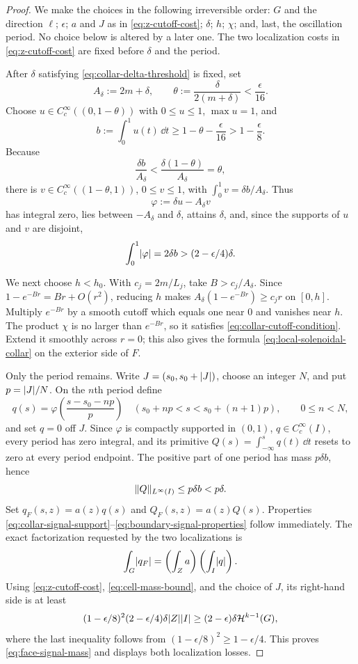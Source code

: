 \begin{proof}
We make the choices in the following irreversible order: $G$ and the
direction $\ell$; $\epsilon$; $a$ and $J$ as in
\eqref{eq:z-cutoff-cost}; $\delta$; $h$; $\chi$; and, last, the oscillation
period.  No choice below is altered by a later one.  The two localization
costs in \eqref{eq:z-cutoff-cost} are fixed before $\delta$ and the period.

After $\delta$ satisfying \eqref{eq:collar-delta-threshold} is fixed, set
\[
 A_\delta:=2m+\delta,
 \qquad
 \theta:=\frac{\delta}{2(m+\delta)}<\frac{\epsilon}{16}.
\]
Choose $u\in C_c^\infty((0,1-\theta))$ with $0\le u\le1$,
$\max u=1$, and
\[
 b:=\int_0^1u(t)\,\dd t
 \ge1-\theta-\frac{\epsilon}{16}>1-\frac{\epsilon}{8}.
\]
Because
\[
 \frac{\delta b}{A_\delta}
 <\frac{\delta(1-\theta)}{A_\delta}=\theta,
\]
there is $v\in C_c^\infty((1-\theta,1))$, $0\le v\le1$, with
$\int_0^1v=\delta b/A_\delta$.  Thus
\[
 \varphi:=\delta u-A_\delta v
\]
has integral zero, lies between $-A_\delta$ and $\delta$, attains $\delta$,
and, since the supports of $u$ and $v$ are disjoint,
\begin{equation}
\label{eq:cell-mass-bound}
 \int_0^1\lvert \varphi \rvert=2\delta b>(2-\epsilon/4)\delta.
\end{equation}

We next choose $h<h_0$.  With $c_j=2m/L_j$, take
$B>c_j/A_\delta$.  Since $1-e^{-Br}=Br+O(r^2)$, reducing $h$ makes
$A_\delta(1-e^{-Br})\ge c_jr$ on $[0,h]$.  Multiply $e^{-Br}$ by a smooth
cutoff which equals one near $0$ and vanishes near $h$.  The product $\chi$
is no larger than $e^{-Br}$, so it satisfies
\eqref{eq:collar-cutoff-condition}.  Extend it smoothly across $r=0$; this
also gives the formula \eqref{eq:local-solenoidal-collar} on the exterior side
of $F$.

Only the period remains.  Write $J=(s_0,s_0+\lvert J \rvert)$, choose an integer $N$,
and put $p=\lvert J \rvert/N$.  On the $n$th period define
\[
 q(s)=\varphi\left(\frac{s-s_0-np}{p}\right)
 \quad (s_0+np<s<s_0+(n+1)p),
 \qquad 0\le n<N,
\]
and set $q=0$ off $J$.  Since $\varphi$ is compactly supported in $(0,1)$,
$q\in C_c^\infty(I)$, every period has zero integral, and its primitive
$Q(s)=\int_{-\infty}^sq(t)\,\dd t$ resets to zero at every period endpoint.
The positive part of one period has mass $p\delta b$, hence
\begin{equation}
\label{eq:primitive-period-bound}
 \lVert Q \rVert_{L^\infty(I)}\le p\delta b<p\delta.
\end{equation}
Set $q_F(s,z)=a(z)q(s)$ and $Q_F(s,z)=a(z)Q(s)$.  Properties
\eqref{eq:collar-signal-support}--\eqref{eq:boundary-signal-properties}
follow immediately.  The exact factorization requested by the two
localizations is
\[
 \int_G\lvert q_F \rvert
 =\left(\int_Za\right)\left(\int_I\lvert q \rvert\right).
\]
Using \eqref{eq:z-cutoff-cost}, \eqref{eq:cell-mass-bound}, and the choice of
$J$, its right-hand side is at least
\[
 (1-\epsilon/8)^2(2-\epsilon/4)\delta\lvert Z \rvert\lvert I \rvert
 \ge(2-\epsilon)\delta\mathcal{H}^{k-1}(G),
\]
where the last inequality follows from
$(1-\epsilon/8)^2\ge1-\epsilon/4$.  This proves
\eqref{eq:face-signal-mass} and displays both localization losses.


\end{proof}
